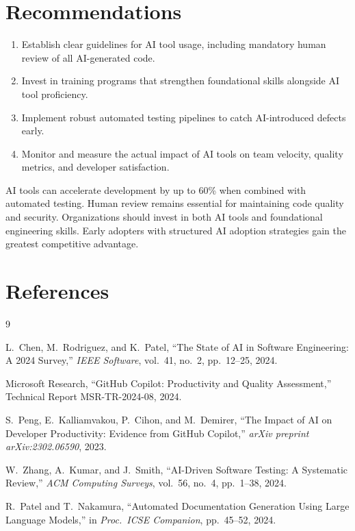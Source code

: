 \documentclass[
    language=english,
    doctype=white-paper,
    institution=none,
]{../../omnilatex}
\begin{document}
\section{Recommendations}

\begin{enumerate}
    \item Establish clear guidelines for AI tool usage, including mandatory human
          review of all AI-generated code.
    \item Invest in training programs that strengthen foundational skills alongside
          AI tool proficiency.
    \item Implement robust automated testing pipelines to catch AI-introduced
          defects early.
    \item Monitor and measure the actual impact of AI tools on team velocity,
          quality metrics, and developer satisfaction.
\end{enumerate}

\begin{keytakeaways}
AI tools can accelerate development by up to 60\% when combined with automated testing.
Human review remains essential for maintaining code quality and security.
Organizations should invest in both AI tools and foundational engineering skills.
Early adopters with structured AI adoption strategies gain the greatest competitive advantage.
\end{keytakeaways}

\section*{References}

\begin{thebibliography}{9}

L.~Chen, M.~Rodriguez, and K.~Patel,
\newblock ``The State of AI in Software Engineering: A 2024 Survey,''
\newblock \emph{IEEE Software}, vol.~41, no.~2, pp.~12--25, 2024.

Microsoft Research,
\newblock ``GitHub Copilot: Productivity and Quality Assessment,''
\newblock Technical Report MSR-TR-2024-08, 2024.

S.~Peng, E.~Kalliamvakou, P.~Cihon, and M.~Demirer,
\newblock ``The Impact of AI on Developer Productivity: Evidence from GitHub Copilot,''
\newblock \emph{arXiv preprint arXiv:2302.06590}, 2023.

W.~Zhang, A.~Kumar, and J.~Smith,
\newblock ``AI-Driven Software Testing: A Systematic Review,''
\newblock \emph{ACM Computing Surveys}, vol.~56, no.~4, pp.~1--38, 2024.

R.~Patel and T.~Nakamura,
\newblock ``Automated Documentation Generation Using Large Language Models,''
\newblock in \emph{Proc.\ ICSE Companion}, pp.~45--52, 2024.

\end{thebibliography}
\end{document}
